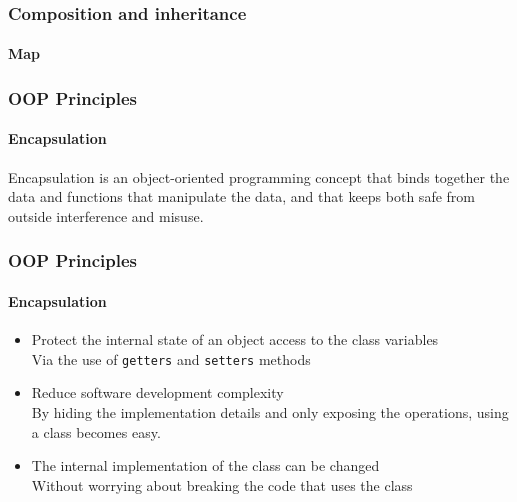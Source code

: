 \begin{frame}[fragile,c]
    \frametitle{Composition and inheritance}
    \framesubtitle{Map}

\end{frame}

\begin{frame}
    \frametitle{OOP Principles}
    \framesubtitle{Encapsulation}

    Encapsulation is an object-oriented programming concept that binds together the data and functions that manipulate the data,
    and that keeps both safe from outside interference and misuse.
\end{frame}

\begin{frame}
    \frametitle{OOP Principles}
    \framesubtitle{Encapsulation}

    \begin{itemize}
        \item Protect the internal state of an object access to the class variables\pause
              \textcolor{ecgrey!50}{
              \\Via the use of \texttt{getters} and \texttt{setters} methods}
        \pause
        \item Reduce software development complexity\pause
              \textcolor{ecgrey!50}{
              \\By hiding the implementation details and only exposing the operations, using a class becomes easy.}
        \pause
        \item The internal implementation of the class can be changed\pause
              \textcolor{ecgrey!50}{
              \\Without worrying about breaking the code that uses the class}
    \end{itemize}
\end{frame}

